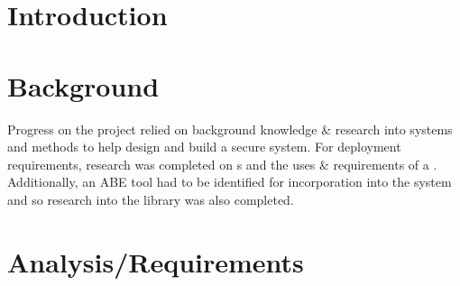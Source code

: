 \documentclass[british]{l4proj}
\begin{document}
\newcommand{\thePolicyLang}{\textsc{PolLang}\textsubscript{ABE}\xspace}
\newcommand{\theResServer}{\textsc{ResSrvr}\textsubscript{ABE}\xspace}
\newcommand{\OpenABE}{\textsc{OpenABE}\xspace}
\newcommand{\PyOpenABE}{\textsc{PyOpenABE}\xspace}

\chapter{Introduction}
\label{ch:introduction}











\chapter{Background}
\label{ch:background}

Progress on the project relied on background knowledge \& research into  systems and  methods to help design and build a secure system. For deployment requirements, research was completed on s and the uses \& requirements of a . Additionally, an ABE tool had to be identified for incorporation into the system and so research into the  library was also completed.











\chapter{Analysis/Requirements}
\label{ch:analysis}
\end{document}
